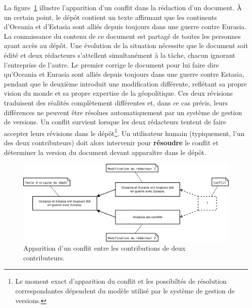 La figure~\ref{fig:conflit} illustre l'apparition d'un conflit dans la
rédaction d'un document. À un certain point, le dépôt contient un
texte affirmant que les continents d'Oceania et d'Estasia sont alliés
depuis toujours dans une guerre contre Eurasia. La connaissance du
contenu de ce document est partagé de toutes les personnes ayant accès
au dépôt. Une évolution de la situation nécessite que le document soit
édité et deux rédacteurs s'attellent simultanément à la tâche, chacun
ignorant l'entreprise de l'autre. Le premier corrige le document pour
lui faire dire qu'Oceania et Eurasia sont alliés depuis toujours dans
une guerre contre Estasia, pendant que le deuxième introduit une
modification différente, reflétant sa propre vision du monde et sa
propre expertise de la géopolitique. Ces deux révisions traduisent des
réalités complètement différentes et, dans ce cas précis, leurs
différences ne peuvent être résolues automatiquement par un système de
gestion de versions. Un conflit survient lorsque les deux rédacteurs
tentent de faire accepter leurs révisions dans le dépôt\footnote{Le
  moment exact d'apparition du conflit et les possibiltés de
  résolution correspondantes dépendent du modèle utilisé par le
  système de gestion de versions.}. Un utilisateur humain
(typiquement, l'un des deux contributeurs) doit alors intervenir pour
\textbf{résoudre} le conflit et
déterminer la version du document devant apparaître dans le dépôt.

\begin{figure}[h!]
  \includegraphics[width=15cm]{figures/conflit}
  \caption{Apparition d'un conflit entre les contributions de deux
    contributeurs.\label{fig:conflit}}
\end{figure}

